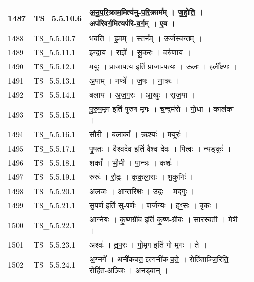 \documentclass[17pt]{extarticle}
\begin{document}
\begin{longtable}{||p{0.4in}||p{0.9in}||p{4.0in}||p{0.9in}||}
        \hline
            1487 & TS\_5.5.10.6 & अ॒नु॒प॒रि॒क्राम॒मित्य॑नु{-}प॒रि॒क्राम᳚म्   ।   जु॒हो॒ति॒   ।   अप॑रिवर्ग॒मित्यप॑रि{-}व॒र्ग॒म्   ।   ए॒व   ।    &      \\
        \hline
            1488 & TS\_5.5.10.7 & भ॒व॒ति॒   ।   इ॒मम्   ।   स्तन᳚म्   ।   ऊर्ज॑स्वन्तम्   ।    &      \\
        \hline
            1489 & TS\_5.5.11.1 & इन्द्रा॑य   ।   राज्ञे᳚   ।   सू॒क॒रः   ।   वरु॑णाय   ।    &      \\
        \hline
            1490 & TS\_5.5.12.1 & म॒युः   ।   प्रा॒जा॒प॒त्य इति॑ प्राजा{-}प॒त्यः   ।   ऊ॒लः   ।   हली᳚क्ष्णः   ।    &      \\
        \hline
            1491 & TS\_5.5.13.1 & अ॒पाम्   ।   नप्त्रे᳚   ।   ज॒षः   ।   ना॒क्रः   ।    &      \\
        \hline
            1492 & TS\_5.5.14.1 & बला॑य   ।   अ॒ज॒ग॒रः   ।   आ॒खुः   ।   सृ॒ज॒या   ।    &      \\
        \hline
            1493 & TS\_5.5.15.1 & पु॒रु॒ष॒मृ॒ग इति॑ पुरुष{-}मृ॒गः   ।   च॒न्द्रम॑से   ।   गो॒धा   ।   काल॑का   ।    &      \\
        \hline
            1494 & TS\_5.5.16.1 & सौ॒री   ।   ब॒लाका᳚   ।   ऋश्यः॑   ।   म॒यूरः॑   ।    &      \\
        \hline
            1495 & TS\_5.5.17.1 & पृ॒ष॒तः   ।   वै॒श्व॒दे॒व इति॑ वैश्व{-}दे॒वः   ।   पि॒त्वः   ।   न्यङ्कुः॑   ।    &      \\
        \hline
            1496 & TS\_5.5.18.1 & शका᳚   ।   भौ॒मी   ।   पा॒न्त्रः   ।   कशः॑   ।    &      \\
        \hline
            1497 & TS\_5.5.19.1 & रुरुः॑   ।   रौ॒द्रः   ।   कृ॒क॒ला॒सः   ।   श॒कुनिः॑   ।    &      \\
        \hline
            1498 & TS\_5.5.20.1 & अ॒ल॒जः   ।   आ॒न्त॒रि॒क्षः   ।   उ॒द्रः   ।   म॒द्गुः   ।    &      \\
        \hline
            1499 & TS\_5.5.21.1 & सु॒प॒र्ण इति॑ सु{-}प॒र्णः   ।   पा॒र्ज॒न्यः   ।   हꣳ॒॒सः   ।   वृकः॑   ।    &      \\
        \hline
            1500 & TS\_5.5.22.1 & आ॒ग्ने॒यः   ।   कृ॒ष्णग्री॑व॒ इति॑ कृ॒ष्ण{-}ग्री॒वः॒   ।   सा॒र॒स्व॒ती   ।   मे॒षी   ।    &      \\
        \hline
            1501 & TS\_5.5.23.1 & अश्वः॑   ।   तू॒प॒रः   ।   गो॒मृ॒ग इति॑ गो{-}मृ॒गः   ।   ते   ।    &      \\
        \hline
            1502 & TS\_5.5.24.1 & अ॒ग्नये᳚   ।   अनी॑कवत॒ इत्यनी॑क{-}व॒ते॒   ।   रोहि॑ताञ्जि॒रिति॒ रोहि॑त{-}अ॒ञ्जिः॒   ।   अ॒न॒ड्वान्   ।    &      \\

\end{longtable}
\end{document}
